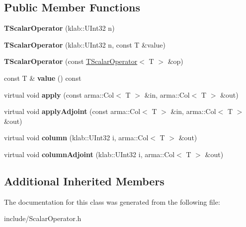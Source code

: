 \subsection*{Public Member Functions}
\begin{DoxyCompactItemize}
\item 
{\bfseries T\+Scalar\+Operator} (klab\+::\+U\+Int32 n)\hypertarget{classkl1p_1_1TScalarOperator_af5450a1bed2b5517e778ab3891ea3690}{}\label{classkl1p_1_1TScalarOperator_af5450a1bed2b5517e778ab3891ea3690}

\item 
{\bfseries T\+Scalar\+Operator} (klab\+::\+U\+Int32 n, const T \&value)\hypertarget{classkl1p_1_1TScalarOperator_afb7ccd6b7863acc2815f0af7df16181e}{}\label{classkl1p_1_1TScalarOperator_afb7ccd6b7863acc2815f0af7df16181e}

\item 
{\bfseries T\+Scalar\+Operator} (const \hyperlink{classkl1p_1_1TScalarOperator}{T\+Scalar\+Operator}$<$ T $>$ \&op)\hypertarget{classkl1p_1_1TScalarOperator_a8d86c02ca4652eaf454f774a45bf08ec}{}\label{classkl1p_1_1TScalarOperator_a8d86c02ca4652eaf454f774a45bf08ec}

\item 
const T \& {\bfseries value} () const \hypertarget{classkl1p_1_1TScalarOperator_a47f713b65d665e02bb272ee9b731798b}{}\label{classkl1p_1_1TScalarOperator_a47f713b65d665e02bb272ee9b731798b}

\item 
virtual void {\bfseries apply} (const arma\+::\+Col$<$ T $>$ \&in, arma\+::\+Col$<$ T $>$ \&out)\hypertarget{classkl1p_1_1TScalarOperator_aa70891aac2f231e029c118f3454851aa}{}\label{classkl1p_1_1TScalarOperator_aa70891aac2f231e029c118f3454851aa}

\item 
virtual void {\bfseries apply\+Adjoint} (const arma\+::\+Col$<$ T $>$ \&in, arma\+::\+Col$<$ T $>$ \&out)\hypertarget{classkl1p_1_1TScalarOperator_aca7f04d8346e3d5b1f42f00557f2f6b3}{}\label{classkl1p_1_1TScalarOperator_aca7f04d8346e3d5b1f42f00557f2f6b3}

\item 
virtual void {\bfseries column} (klab\+::\+U\+Int32 i, arma\+::\+Col$<$ T $>$ \&out)\hypertarget{classkl1p_1_1TScalarOperator_acbafc41497e97861cb55911143b5f288}{}\label{classkl1p_1_1TScalarOperator_acbafc41497e97861cb55911143b5f288}

\item 
virtual void {\bfseries column\+Adjoint} (klab\+::\+U\+Int32 i, arma\+::\+Col$<$ T $>$ \&out)\hypertarget{classkl1p_1_1TScalarOperator_a0079860dce7ea7a642322c8f24840e79}{}\label{classkl1p_1_1TScalarOperator_a0079860dce7ea7a642322c8f24840e79}

\end{DoxyCompactItemize}
\subsection*{Additional Inherited Members}


The documentation for this class was generated from the following file\+:\begin{DoxyCompactItemize}
\item 
include/Scalar\+Operator.\+h\end{DoxyCompactItemize}
